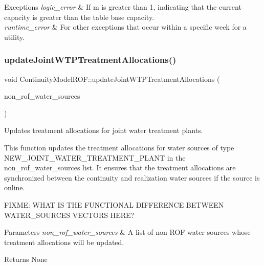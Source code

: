 \begin{DoxyExceptions}{Exceptions}
{\em logic\+\_\+error} & If {\ttfamily m} is greater than 1, indicating that the current capacity is greater than the table base capacity. \\
\hline
{\em runtime\+\_\+error} & For other exceptions that occur within a specific week for a utility. \\
\hline
\end{DoxyExceptions}
\mbox{\label{classContinuityModelROF_a082567cc3a16b971632c14b5a603c692}} 
\subsubsection{\texorpdfstring{update\+Joint\+W\+T\+P\+Treatment\+Allocations()}{updateJointWTPTreatmentAllocations()}}
{\footnotesize\ttfamily void Continuity\+Model\+R\+O\+F\+::update\+Joint\+W\+T\+P\+Treatment\+Allocations (\begin{DoxyParamCaption}\item[{const vector$<$ \mbox{\hyperlink{classWaterSource}{Water\+Source}} $\ast$$>$ \&}]{non\+\_\+rof\+\_\+water\+\_\+sources }\end{DoxyParamCaption})}



Updates treatment allocations for joint water treatment plants. 

This function updates the treatment allocations for water sources of type {\ttfamily N\+E\+W\+\_\+\+J\+O\+I\+N\+T\+\_\+\+W\+A\+T\+E\+R\+\_\+\+T\+R\+E\+A\+T\+M\+E\+N\+T\+\_\+\+P\+L\+A\+NT} in the {\ttfamily non\+\_\+rof\+\_\+water\+\_\+sources} list. It ensures that the treatment allocations are synchronized between the continuity and realization water sources if the source is online.

F\+I\+X\+ME\+: W\+H\+AT IS T\+HE F\+U\+N\+C\+T\+I\+O\+N\+AL D\+I\+F\+F\+E\+R\+E\+N\+CE B\+E\+T\+W\+E\+EN W\+A\+T\+E\+R\+\_\+\+S\+O\+U\+R\+C\+ES V\+E\+C\+T\+O\+RS H\+E\+RE?


\begin{DoxyParams}{Parameters}
{\em non\+\_\+rof\+\_\+water\+\_\+sources} & A list of non-\/\+R\+OF water sources whose treatment allocations will be updated.\\
\hline
\end{DoxyParams}
\begin{DoxyReturn}{Returns}
None 
\end{DoxyReturn}
\mbox{\label{classContinuityModelROF_a06cf47a32d6793b0ee912deccf92fc5b}} 

